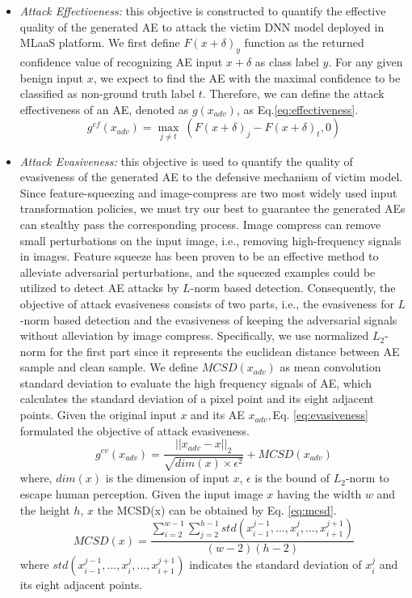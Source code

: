 \documentclass[lettersize,journal]{IEEEtran}
\begin{document}
	
	
	\begin{itemize}
		
		\item \textit{Attack Effectiveness:} this objective is constructed to quantify the effective quality of the generated AE to attack the victim DNN model deployed in MLaaS platform. We first define $F(x + \delta)_y$ function as the returned confidence value of recognizing AE input $x + \delta$ as class label $y$. For any given benign input $x$, we expect to find the AE with the maximal confidence to be classified as non-ground truth label $t$. Therefore, we can define the attack effectiveness of an AE, denoted as $g(x_{adv})$, as Eq.\ref{eq:effectiveness}.
		\begin{equation}
			\label{eq:effectiveness}
			g^{ef}(x_{adv}) = \max\limits_{j \neq t} \: (F(x+\delta)_j - F(x+\delta)_t, 0)
		\end{equation}
		
		
		\item \textit{Attack Evasiveness:} this objective is used to quantify the quality of evasiveness of the generated AE to the defensive mechanism of victim model. Since feature-squeezing and image-compress are two most widely used input transformation policies, we must try our best to guarantee the generated AEs can stealthy pass the corresponding process. Image compress can remove small perturbations on the input image, i.e., removing high-frequency signals in images. Feature squeeze has been proven to be an effective method to alleviate adversarial perturbations, and the squeezed examples could be utilized to detect AE attacks by $L$-norm based detection. Consequently, the objective of attack evasiveness consists of two parts, i.e., the evasiveness for $L$-norm based detection and the evasiveness of keeping the adversarial signals without alleviation by image compress. Specifically, we use normalized $L_2$-norm for the first part since it represents the euclidean distance between AE sample and clean sample. We define $MCSD(x_{adv})$ as mean convolution standard deviation to evaluate the high frequency signals of AE, which calculates the standard deviation of a pixel point and its eight adjacent points. Given the original input $x$ and its AE $x_{adv}, $Eq. \ref{eq:evasiveness} formulated the objective of attack evasiveness.
		\begin{equation}
			\label{eq:evasiveness}
			g^{ev}(x_{adv}) =\frac{||x_{adv}-x||_2}{\sqrt{dim(x)\times \epsilon^2}} + MCSD(x_{adv})
		\end{equation}
		where, $dim(x)$ is the dimension of input $x$, $\epsilon$ is the bound of $L_2$-norm to escape human perception. Given the input image $x$ having the width $w$ and the height $h$, $x$ the MCSD(x) can be obtained by Eq. \ref{eq:mcsd}.
		\begin{equation}
			\label{eq:mcsd}
			MCSD(x)= \frac{\sum_{i=2}^{w-1}\sum_{j=2}^{h-1} std(x_{i-1}^{j-1},..., x_i^j, ..., x_{i+1}^{j+1})}{(w-2)(h-2)}
		\end{equation} 
		where $std(x_{i-1}^{j-1},..., x_i^j, ..., x_{i+1}^{j+1})$ indicates the standard deviation of $x_i^j$ and its eight adjacent points. 
		

\end{itemize}
\end{document}
